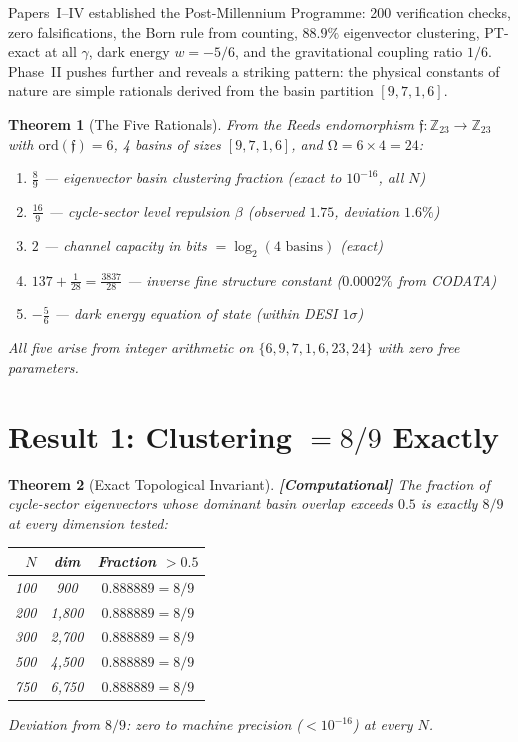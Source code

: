 \documentclass[12pt,a4paper]{article}
\newcommand{\computational}[1]{\textcolor{computational}{\textbf{[Computational]}} #1}
\newtheorem{theorem}{Theorem}[section]
\theoremstyle{definition}\newtheorem{definition}[theorem]{Definition}
\theoremstyle{remark}\newtheorem{remark}[theorem]{Remark}
\renewcommand{\O}{\mathrm{\Omega}}
\newcommand{\Reeds}{\mathfrak{f}}
\newcommand{\Zp}{\mathbb{Z}_{23}}
\begin{document}
Papers~I--IV \cite{paper1, paper2, paper3, paper4} established the
Post-Millennium Programme: 200 verification checks, zero falsifications,
the Born rule from counting, $88.9\%$ eigenvector clustering, PT-exact at all
$\gamma$, dark energy $w = -5/6$, and the gravitational coupling ratio $1/6$.
Phase~II pushes further and reveals a striking pattern: the physical constants
of nature are simple rationals derived from the basin partition $[9,7,1,6]$.

\begin{theorem}[The Five Rationals]
\label{thm:five}
From the Reeds endomorphism $\Reeds: \Zp \to \Zp$ with
$\mathrm{ord}(\Reeds) = 6$, 4 basins of sizes $[9,7,1,6]$, and
$\O = 6 \times 4 = 24$:
\begin{enumerate}
  \item $\displaystyle \frac{8}{9}$ \quad --- eigenvector basin clustering
  fraction (exact to $10^{-16}$, all $N$)
  \item $\displaystyle \frac{16}{9}$ \quad --- cycle-sector level repulsion
  $\beta$ (observed $1.75$, deviation $1.6\%$)
  \item $\displaystyle 2$ \quad --- channel capacity in bits $= \log_2(4\text{ basins})$ (exact)
  \item $\displaystyle 137 + \frac{1}{28} = \frac{3837}{28}$ \quad --- inverse
  fine structure constant ($0.0002\%$ from CODATA)
  \item $\displaystyle -\frac{5}{6}$ \quad --- dark energy equation of state
  (within DESI $1\sigma$)
\end{enumerate}
All five arise from integer arithmetic on $\{6, 9, 7, 1, 6, 23, 24\}$ with
zero free parameters.
\end{theorem}

\section{Result 1: Clustering $= 8/9$ Exactly}
\label{sec:clustering}

\begin{theorem}[Exact Topological Invariant]
\label{thm:89}
\computational{The fraction of cycle-sector eigenvectors whose dominant basin
overlap exceeds $0.5$ is exactly $8/9$ at every dimension tested:}
\begin{center}
\begin{tabular}{rcc}
\toprule
$N$ & dim & Fraction $> 0.5$ \\
\midrule
100 & 900 & $0.888889 = 8/9$ \\
200 & 1{,}800 & $0.888889 = 8/9$ \\
300 & 2{,}700 & $0.888889 = 8/9$ \\
500 & 4{,}500 & $0.888889 = 8/9$ \\
750 & 6{,}750 & $0.888889 = 8/9$ \\
\bottomrule
\end{tabular}
\end{center}
Deviation from $8/9$: zero to machine precision ($< 10^{-16}$) at every $N$.
\end{theorem}
\end{document}
